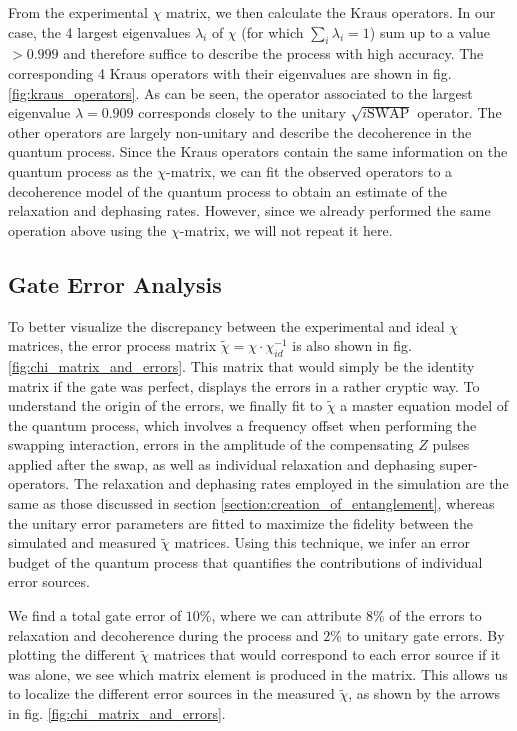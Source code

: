 From the experimental $\chi$ matrix, we then calculate the Kraus operators. In our case, the 4 largest eigenvalues $\lambda_i$ of $\chi$ (for which $\sum\limits_i \lambda_i = 1$) sum up to a value $>0.999$ and therefore suffice to describe the process with high accuracy. The corresponding 4 Kraus operators with their eigenvalues are shown in fig. \ref{fig:kraus_operators}. As can be seen, the operator associated to the largest eigenvalue $\lambda=0.909$ corresponds closely to the unitary $\sqrt{i\mathrm{SWAP}}$ operator. The other operators are largely non-unitary and describe the decoherence in the quantum process. Since the Kraus operators contain the same information on the quantum process as the $\chi$-matrix, we can fit the observed operators to a decoherence model of the quantum process to obtain an estimate of the relaxation and dephasing rates. However, since we already performed the same operation above using the $\chi$-matrix, we will not repeat it here.

\subsection{Gate Error Analysis}

 To better visualize the discrepancy between the experimental and ideal $\chi$ matrices, the error process matrix $\tilde{\chi} = \chi\cdot\chi_{id}^{-1}$ is also shown in fig. \ref{fig:chi_matrix_and_errors}. This matrix that would simply be the identity matrix if the gate was perfect, displays the errors in a rather cryptic way. To understand the origin of the errors, we finally fit to $\tilde{\chi}$ a master equation model of the quantum process, which involves a frequency offset when performing the swapping interaction, errors in the amplitude of the compensating $Z$ pulses applied after the swap, as well as individual relaxation and dephasing super-operators. The relaxation and dephasing rates employed in the simulation are the same as those discussed in section \ref{section:creation_of_entanglement}, whereas the unitary error parameters are fitted to maximize the fidelity between the simulated and measured $\tilde{\chi}$ matrices. Using this technique, we infer an error budget of the quantum process that quantifies the contributions of individual error sources.

We find a total gate error of $10 \%$, where we can attribute $8\%$ of the errors to relaxation and decoherence during the process and $2\%$ to unitary gate errors. By plotting the different $\tilde{\chi}$ matrices that would correspond to each error source if it was alone, we see which matrix element is produced in the matrix. This allows us to localize the different error sources in the measured $\tilde{\chi}$, as shown by the arrows in fig. \ref{fig:chi_matrix_and_errors}.

